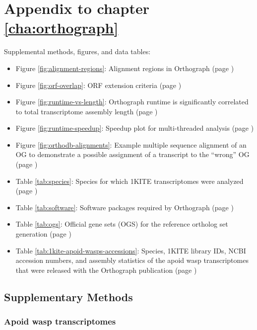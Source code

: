 \chapter{Appendix to chapter \ref{cha:orthograph}}

\ifdraft{%
}%
{%
}%

Supplemental methods, figures, and data tables:

\begin{itemize}
	\item Figure \ref{fig:alignment-regions}: Alignment regions in Orthograph (page \pageref{fig:alignment-regions})
	\item Figure \ref{fig:orf-overlap}: ORF extension criteria (page \pageref{fig:orf-overlap})
	\item Figure \ref{fig:runtime-vs-length}: Orthograph runtime is significantly correlated to total transcriptome assembly length (page \pageref{fig:runtime-vs-length})
	\item Figure \ref{fig:runtime-speedup}: Speedup plot for multi-threaded analysis (page \pageref{fig:runtime-speedup})
	\item Figure \ref{fig:orthodb-alignments}: Example multiple sequence alignment of an OG to demonstrate a possible assignment of a transcript to the ``wrong'' OG (page \pageref{fig:orthodb-alignments})
\end{itemize}

\begin{itemize}
	\item Table \ref{tab:species}: Species for which 1KITE transcriptomes were analyzed (page \pageref{tab:species})
	\item Table \ref{tab:software}: Software packages required by Orthograph (page \pageref{tab:software})
	\item Table \ref{tab:ogs}: Official gene sets (OGS) for the reference ortholog set generation (page \pageref{tab:ogs})
	\item Table \ref{tab:1kite-apoid-wasps-accessions}: Species, 1KITE library IDs, NCBI accession numbers, and assembly statistics of the apoid 
wasp transcriptomes that were released with the Orthograph publication (page \pageref{tab:1kite-apoid-wasps-accessions})
\end{itemize}

\section{Supplementary Methods}

\subsection{Apoid wasp transcriptomes}\label{apoid-wasp-transcriptomes}

